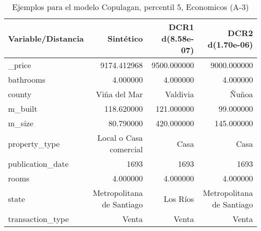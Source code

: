 \begin{table}[H]
\centering
\fontsize{10}{14}\selectfont
\caption{Ejemplos para el modelo Copulagan, percentil 5, Economicos (A-3)}
\label{table-example-economicos-a-3-copulagan-5p}
\begin{tabular}{|l|r|r|r|}
\hline
\rowcolor[gray]{0.8}
Variable/Distancia & Sintético & DCR1 d(8.58e-07) & DCR2 d(1.70e-06) \\
\hline \_price & \cellcolor[rgb]{0.9, 0.54, 0.52} 9174.412968 & 9500.000000 & 9000.000000 \\
\hline bathrooms & \cellcolor[rgb]{0.9, 0.54, 0.52} 4.000000 & \cellcolor[rgb]{0.9, 0.54, 0.52} 4.000000 & \cellcolor[rgb]{0.9, 0.54, 0.52} 4.000000 \\
\hline county & \cellcolor[rgb]{0.9, 0.54, 0.52} Viña del Mar & Valdivia & Ñuñoa \\
\hline m\_built & \cellcolor[rgb]{0.9, 0.54, 0.52} 118.620000 & 121.000000 & 99.000000 \\
\hline m\_size & \cellcolor[rgb]{0.9, 0.54, 0.52} 80.790000 & 420.000000 & 145.000000 \\
\hline property\_type & \cellcolor[rgb]{0.9, 0.54, 0.52} Local o Casa comercial & Casa & Casa \\
\hline publication\_date & \cellcolor[rgb]{0.9, 0.54, 0.52} 1693 & \cellcolor[rgb]{0.9, 0.54, 0.52} 1693 & \cellcolor[rgb]{0.9, 0.54, 0.52} 1693 \\
\hline rooms & \cellcolor[rgb]{0.9, 0.54, 0.52} 4.000000 & \cellcolor[rgb]{0.9, 0.54, 0.52} 4.000000 & \cellcolor[rgb]{0.9, 0.54, 0.52} 4.000000 \\
\hline state & \cellcolor[rgb]{0.9, 0.54, 0.52} Metropolitana de Santiago & Los Ríos & \cellcolor[rgb]{0.9, 0.54, 0.52} Metropolitana de Santiago \\
\hline transaction\_type & \cellcolor[rgb]{0.9, 0.54, 0.52} Venta & \cellcolor[rgb]{0.9, 0.54, 0.52} Venta & \cellcolor[rgb]{0.9, 0.54, 0.52} Venta \\
\hline
\end{tabular}
\end{table}
